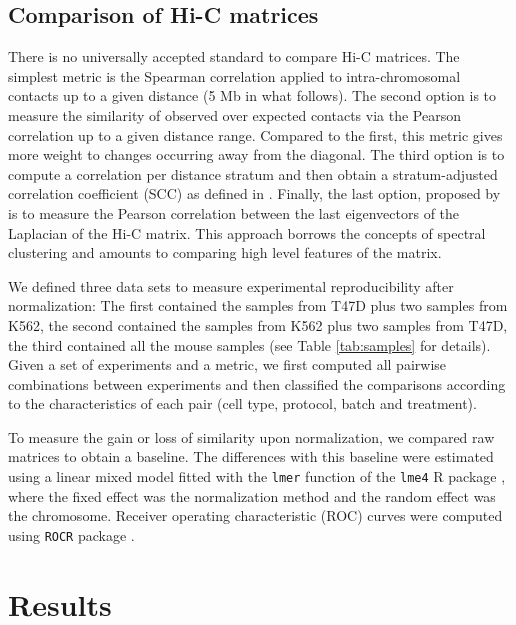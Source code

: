 \documentclass{bioinfo}
\begin{document}
\begin{methods}
\subsection{Comparison of Hi-C matrices}
\label{sec:comp}

There is no universally accepted standard to compare Hi-C matrices. The
simplest metric is the Spearman correlation applied to intra-chromosomal
contacts up to a given distance (5 Mb in what follows). The second option
is to measure the similarity of observed over expected contacts via the
Pearson correlation up to a given distance range. Compared to the first,
this metric gives more weight to changes occurring away from the diagonal.
The third option is to compute a correlation per distance stratum and then
obtain a stratum-adjusted correlation coefficient (SCC) as defined in
\cite{yang2017hicrep}. Finally, the last option, proposed by
\cite{yan2017hicspector} is to measure the Pearson correlation between the
last eigenvectors of the Laplacian of the Hi-C matrix. This approach
borrows the concepts of spectral clustering \citep{von2007tutorial} and
amounts to comparing high level features of the matrix.

We defined three data sets to measure experimental reproducibility after
normalization: The first contained the samples from T47D plus two samples
from K562, the second contained the samples from K562 plus two samples
from T47D, the third contained all the mouse samples (see Table
\ref{tab:samples} for details). Given a set of experiments and a metric,
we first computed all pairwise combinations between experiments and then
classified the comparisons according to the characteristics of each pair
(cell type, protocol, batch and treatment).

To measure the gain or loss of similarity upon normalization, we compared
raw matrices to obtain a baseline. The differences with this baseline were
estimated using a linear mixed model fitted with the \texttt{lmer}
function of the \texttt{lme4} R package \citep{bates2015lme4}, where the
fixed effect was the normalization method and the random effect was the
chromosome. Receiver operating characteristic (ROC) curves were computed
using \texttt{ROCR} package \citep{sing2005rocr}.



\end{methods}





\section{Results}
\end{document}
